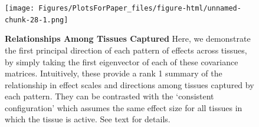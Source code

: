 \begin{figure}[htbp]
\texttt{[image: Figures/PlotsForPaper\_files/figure-html/unnamed-chunk-28-1.png]}
\caption{\textbf{Relationships Among Tissues Captured} Here, we demonstrate the first principal direction of each pattern of effects across tissues, by simply taking the first eigenvector of each of these covariance matrices. Intuitively, these provide a rank 1 summary of the relationship in effect scales and directions among tissues captured by each pattern. They can be contrasted with the `consistent configuration' which assumes the same effect size for all tissues in which the tissue is active. See text for details.}
\label{fig:pcplot}
\end{figure}\newline

%

